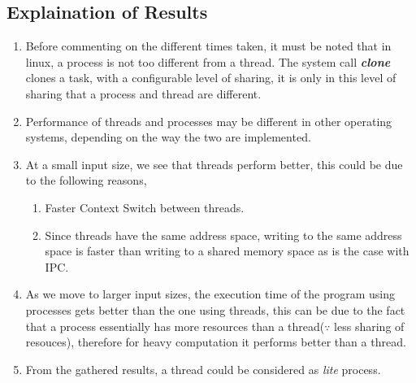 \documentclass[a4paper,12pt]{report}
\begin{document}
\subsection*{Explaination of Results}
\begin{enumerate}
\item Before commenting on the different times taken, it must be noted that in linux, a process is not too different from a thread. The system call\textit{ \textbf{clone}} clones a task, with a configurable level of sharing, it is only in this level of sharing that a process and thread are different.
\item Performance of threads and processes may be different in other operating systems, depending on the way the two are implemented.
\item At a small input size, we see that threads perform better, this could be due to the following reasons,
\begin{enumerate}
\item Faster Context Switch between threads.
\item Since threads have the same address space, writing to the same address space is faster than writing to a shared memory space as is the case with IPC.
\end{enumerate}
\item As we move to larger input sizes, the execution time of the program using processes gets better than the one using threads, this can be due to the fact that a process essentially has more resources than a thread($\because$ less sharing of resouces), therefore for heavy computation it performs better than a thread.
\item From the gathered results, a thread could be considered as \textit{lite} process.
\end{enumerate}
\end{document}

